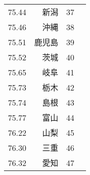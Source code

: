 \begin{table}[ht]
\begin{tabular}{rrlr}
 75.44 & 新潟 &  37 \\
 75.46 & 沖縄 &  38 \\
 75.51 & 鹿児島 &  39 \\
 75.52 & 茨城 &  40 \\
 75.65 & 岐阜 &  41 \\
 75.73 & 栃木 &  42 \\
 75.74 & 島根 &  43 \\
 75.77 & 富山 &  44 \\
 76.22 & 山梨 &  45 \\
 76.30 & 三重 &  46 \\
 76.32 & 愛知 &  47 \\
   \hline
\end{tabular}
\end{table}
